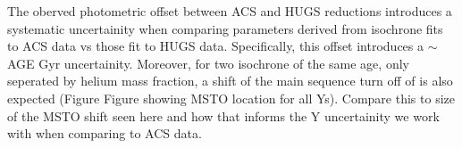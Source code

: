 The oberved photometric offset between ACS and HUGS reductions introduces a systematic uncertainity when comparing parameters derived from isochrone fits to ACS data vs those fit to HUGS data. Specifically, this offset introduces a {\color{red}$\sim$AGE Gyr} uncertainity. Moreover, for two isochrone of the same age, only seperated by helium mass fraction, a shift of the main sequence turn off of is also expected (Figure {\color{red} Figure showing MSTO location for all Ys}). {\color{red}Compare this to size of the MSTO shift seen here and how that informs the Y uncertainity we work with when comparing to ACS data.}
